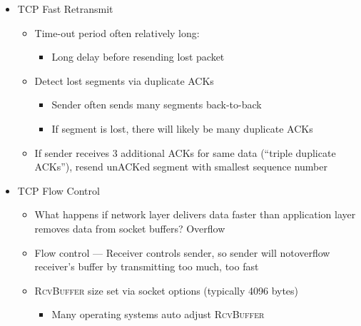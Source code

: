 \begin{itemize}
  \item TCP Fast Retransmit

    \begin{itemize}

      \item Time-out period often relatively long:

        \begin{itemize}

          \item Long delay before resending lost packet

        \end{itemize}

      \item Detect lost segments via duplicate ACKs

        \begin{itemize}

          \item Sender often sends many segments back-to-back

          \item If segment is lost, there will likely be many duplicate ACKs

        \end{itemize}

      \item If sender receives 3 additional ACKs for same data (``triple duplicate ACKs''), resend unACKed segment with smallest sequence number

    \end{itemize}

  \item TCP Flow Control

    \begin{itemize}

      \item What happens if network layer delivers data faster than application layer removes data from socket buffers? Overflow

      \item Flow control — Receiver controls sender, so sender will notoverflow receiver’s buffer by transmitting too much, too fast

      \item \textsc{RcvBuffer} size set via socket options (typically 4096 bytes)

        \begin{itemize}

          \item Many operating systems auto adjust \textsc{RcvBuffer}


\end{itemize}
\end{itemize}
\end{itemize}
